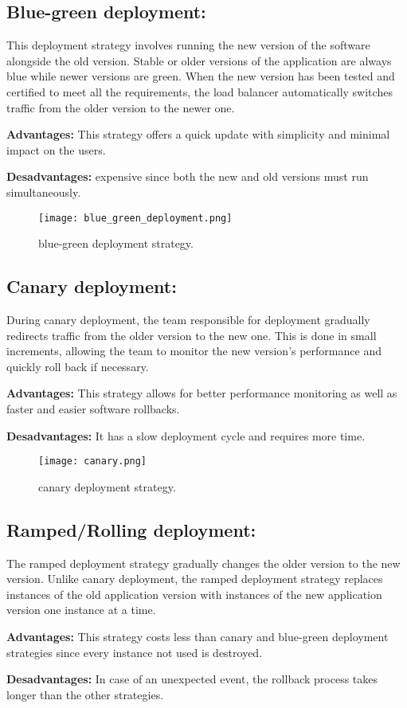 \subsection*{Blue-green deployment:}
This deployment strategy involves running the new version of the software alongside the old version.
Stable or older versions of the application are always blue while newer versions are green.
When the new version has been tested and certified to meet all the requirements, the load balancer automatically switches traffic from the older version to the newer one.
\par \noindent \textbf{Advantages:} This strategy offers a quick update with simplicity and minimal impact on the users.
\par \noindent \textbf{Desadvantages:} expensive since both the new and old versions must run simultaneously.

\begin{figure}[htbp]
    \centering
    \texttt{[image: blue\_green\_deployment.png]}
    \caption{blue-green deployment strategy.}
    \label{fig:blue-green-deployment-strategy}
\end{figure}

\subsection*{Canary deployment:}
During canary deployment, the team responsible for deployment gradually redirects traffic from the older version to the new one.
This is done in small increments, allowing the team to monitor the new version's performance and quickly roll back if necessary.
\par \noindent \textbf{Advantages:} This strategy allows for better performance monitoring as well as faster and easier software rollbacks.
\par \noindent \textbf{Desadvantages:} It has a slow deployment cycle and requires more time.

\begin{figure}[htbp]
    \centering
    \texttt{[image: canary.png]}
    \caption{canary deployment strategy.}
    \label{fig:canary-deployment-strategy}
\end{figure}

\subsection*{Ramped/Rolling deployment:}
The ramped deployment strategy gradually changes the older version to the new version. Unlike canary deployment, the ramped deployment strategy replaces instances of the old application version with instances of the new application version one instance at a time.
\par \noindent \textbf{Advantages:} This strategy costs less than canary and blue-green deployment strategies since every instance not used is destroyed.
\par \noindent \textbf{Desadvantages:} In case of an unexpected event, the rollback process takes longer than the other strategies.

